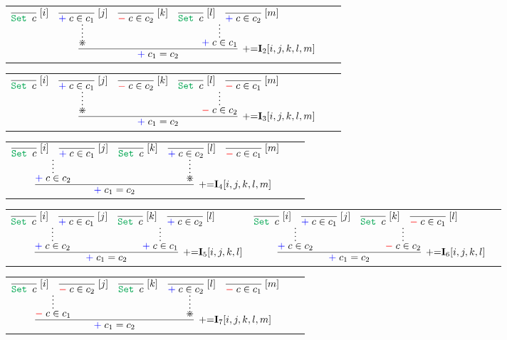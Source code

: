 \documentclass[11pt]{article}
\begin{document}
\bigskip
\noindent
\begin{tabular}{ccc}
$
\infer[\AssertRule{=}\Intro{2}{[i,j,k,l,m]}]{\Assert{c_1= c_2}}{
	\infer*{\divideontimes}{
		\infer[\Label{i}]{\Set{c}}{} 
		& 
		\infer[\Label{j}]{\Assert{c\in c_1}}{}
		& 
		\infer[\Label{k}]{\Deny{c\in c_2}}{}
	}
    &
	\infer*{\Assert{c\in c_1}}{
		\infer[\Label{l}]{\Set{c}}{} 
		& 
		\infer[\Label{m}]{\Assert{c\in c_2}}{}
	}
}
$
\end{tabular}

\bigskip
\noindent
\begin{tabular}{ccc}
$
\infer[\AssertRule{=}\Intro{3}{[i,j,k,l,m]}]{\Assert{c_1= c_2}}{
	\infer*{\divideontimes}{
		\infer[\Label{i}]{\Set{c}}{} 
		& 
		\infer[\Label{j}]{\Assert{c\in c_1}}{}
		& 
		\infer[\Label{k}]{\Deny{c\in c_2}}{}
	}
    &
	\infer*{\Deny{c\in c_2}}{
		\infer[\Label{l}]{\Set{c}}{} 
		& 
		\infer[\Label{m}]{\Deny{c\in c_1}}{}
	}
}
$
\end{tabular}

\bigskip
\noindent
\begin{tabular}{ccc}
$
\infer[\AssertRule{=}\Intro{4}{[i,j,k,l,m]}]{\Assert{c_1= c_2}}{
	\infer*{\Assert{c\in c_2}}{
		\infer[\Label{i}]{\Set{c}}{} 
		& 
		\infer[\Label{j}]{\Assert{c\in c_1}}{}
	}
    &
	\infer*{\divideontimes}{
		\infer[\Label{k}]{\Set{c}}{} 
		& 
		\infer[\Label{l}]{\Assert{c\in c_2}}{}
		& 
		\infer[\Label{m}]{\Deny{c\in c_1}}{}
	}
}
$
\end{tabular}

\bigskip
\noindent
\begin{tabular}{ccc}
$
\infer[\AssertRule{=}\Intro{5}{[i,j,k,l]}]{\Assert{c_1= c_2}}{
	\infer*{\Assert{c\in c_2}}{
		\infer[\Label{i}]{\Set{c}}{} 
		& 
		\infer[\Label{j}]{\Assert{c\in c_1}}{}
	}
    &
	\infer*{\Assert{c\in c_1}}{
		\infer[\Label{k}]{\Set{c}}{} 
		& 
		\infer[\Label{l}]{\Assert{c\in c_2}}{}
	}
}
$
&
$
\infer[\AssertRule{=}\Intro{6}{[i,j,k,l]}]{\Assert{c_1= c_2}}{
	\infer*{\Assert{c\in c_2}}{
		\infer[\Label{i}]{\Set{c}}{} 
		& 
		\infer[\Label{j}]{\Assert{c\in c_1}}{}
	}
    &
	\infer*{\Deny{c\in c_2}}{
		\infer[\Label{k}]{\Set{c}}{} 
		& 
		\infer[\Label{l}]{\Deny{c\in c_1}}{}
	}
}
$
\end{tabular}

\bigskip
\noindent
\begin{tabular}{ccc}
$
\infer[\AssertRule{=}\Intro{7}{[i,j,k,l,m]}]{\Assert{c_1= c_2}}{
	\infer*{\Deny{c\in c_1}}{
		\infer[\Label{i}]{\Set{c}}{} 
		& 
		\infer[\Label{j}]{\Deny{c\in c_2}}{}
	}
    &
	\infer*{\divideontimes}{
		\infer[\Label{k}]{\Set{c}}{} 
		& 
		\infer[\Label{l}]{\Assert{c\in c_2}}{}
		& 
		\infer[\Label{m}]{\Deny{c\in c_1}}{}
	}
}
$
\end{tabular}
\end{document}
